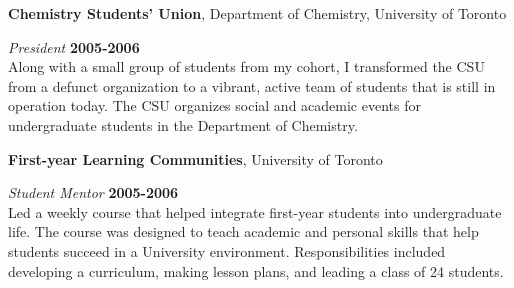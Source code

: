 \documentclass[margin,line]{res}
\begin{document}
\begin{resume}
{\bf Chemistry Students' Union}, Department of Chemistry, University of Toronto

\vspace{-.3cm}
{\em President} \hfill {\bf 2005-2006}\\
Along with a small group of students from my cohort, I transformed the CSU from a defunct
organization to a vibrant, active team of students that is still in operation today. The CSU organizes
social and academic events for undergraduate
students in the Department of Chemistry.

{\bf First-year Learning Communities}, University of Toronto

\vspace{-.3cm}
{\em Student Mentor} \hfill {\bf 2005-2006}\\
Led a weekly course that helped integrate first-year students into undergraduate life.
The course was designed to teach academic and personal skills that help students succeed in a University environment.
Responsibilities included developing a curriculum, making lesson plans, and leading a class of 24 students.

\end{resume}
\end{document}
